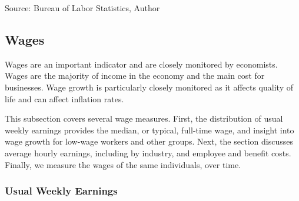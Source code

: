 \documentclass{report}
\makeatletter
\newcommand{\tbllink}[1]{\href{https://raw.githubusercontent.com/bdecon/US-chartbook/master/chartbook/data/#1}{\faTable}}
\newcommand*\short[1]{\expandafter\@gobbletwo\number\numexpr#1\relax}
\newcommand{\absnode}[3]{\node[below right, align=left] at (axis cs: #1,#2) {#3};}
\newcommand{\shdateaxisticks}{
		date coordinates in=x, axis line style={draw=none},
		xmax={2023-11-01},
		max space between ticks=40,	    
		xtick={{1990-01-01}, {1995-01-01}, {2000-01-01}, 
			{2005-01-01}, {2010-01-01}, {2015-01-01}, {2020-01-01}},
		minor xtick={},
		enlarge y limits={0.06}, enlarge x limits={0.01},
		}
\newcommand{\bbar}[2]{extra #1 ticks = {{#2}}, extra #1 tick labels = ,
		extra #1 tick style = {grid=major, grid style={thick, black!25}},}
\newcommand{\stdline}[4]{\addplot[very thick, no markers, color=#1] 
		table [x=#2, y=#3, col sep=comma] {#4};	}
\newcommand{\rbars}{
		\fill[color=black!10] (axis cs:{1990-07-01},\pgfkeysvalueof{/pgfplots/ymin}) rectangle 
			(axis cs:{1991-03-01}, \pgfkeysvalueof{/pgfplots/ymax});
		\fill[color=black!10] (axis cs:{2007-12-01},\pgfkeysvalueof{/pgfplots/ymin}) rectangle 
			(axis cs:{2009-07-01}, \pgfkeysvalueof{/pgfplots/ymax});
		\fill[color=black!10] (axis cs:{2001-03-01},\pgfkeysvalueof{/pgfplots/ymin}) rectangle 
			(axis cs:{2001-11-01}, \pgfkeysvalueof{/pgfplots/ymax});
		\fill[color=black!10] (axis cs:{2020-02-01},\pgfkeysvalueof{/pgfplots/ymin}) rectangle 
			(axis cs:{2020-05-01}, \pgfkeysvalueof{/pgfplots/ymax});}
\makeatother
\begin{document}
{\begin{minipage}{0.475\textwidth}
\hspace{2mm} 

\footnotesize{Source: Bureau of Labor Statistics, Author} \hfill \tbllink{selfemp.csv} \ \ 
\end{minipage} \hspace{5mm}
\begin{minipage}{0.24\textwidth}
\small 
\end{minipage}
\newpage
\vspace*{-10mm}

\begin{minipage}{0.76\textwidth}   
\subsection*{Wages} \hypertarget{labw}{\label{labw}}
\small Wages are an important indicator and are closely monitored by economists. Wages are the majority of income in the economy and the main cost for businesses. Wage growth is particularly closely monitored as it affects quality of life and can affect inflation rates. 

This subsection covers several wage measures. First, the distribution of usual weekly earnings provides the median, or typical, full-time wage, and insight into wage growth for low-wage workers and other groups. Next, the section discusses average hourly earnings, including by industry, and employee and benefit costs. Finally, we measure the wages of the same individuals, over time. 
\vspace{1mm}

\subsubsection*{Usual Weekly Earnings}
\vspace*{-1mm}


\end{minipage}}
\end{document}
